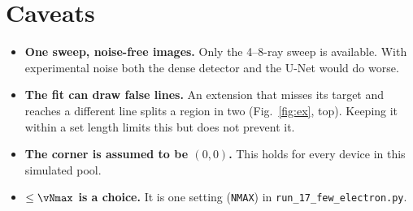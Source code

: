 \documentclass[10pt,a4paper]{article}
\begin{document}
\section{Caveats}
\begin{itemize}
\item \textbf{One sweep, noise-free images.}  Only the 4--8-ray sweep is
  available.  With experimental noise both the dense detector and the U-Net
  would do worse.
\item \textbf{The fit can draw false lines.}  An extension that misses its
  target and reaches a different line splits a region in two
  (Fig.~\ref{fig:ex}, top).  Keeping it within a set length limits this but
  does not prevent it.
\item \textbf{The corner is assumed to be $(0,0)$.}  This holds for every
  device in this simulated pool.
\item \textbf{$\le\vNmax$ is a choice.}  It is one setting (\texttt{NMAX})
  in \texttt{run\_17\_few\_electron.py}.
\end{itemize}
\end{document}
